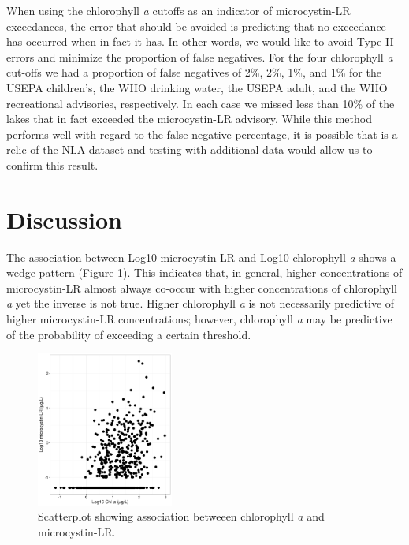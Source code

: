 \documentclass[10pt,a4paper,twocolumn]{article}
\begin{document}
When using the chlorophyll \emph{a} cutoffs as an indicator of
microcystin-LR exceedances, the error that should be avoided is
predicting that no exceedance has occurred when in fact it has. In other
words, we would like to avoid Type II errors and minimize the proportion
of false negatives. For the four chlorophyll \emph{a} cut-offs we had a
proportion of false negatives of 2\%, 2\%, 1\%, and 1\% for the USEPA
children's, the WHO drinking water, the USEPA adult, and the WHO
recreational advisories, respectively. In each case we missed less than
10\% of the lakes that in fact exceeded the microcystin-LR advisory.
While this method performs well with regard to the false negative
percentage, it is possible that is a relic of the NLA dataset and
testing with additional data would allow us to confirm this result.

\section{Discussion}\label{discussion}

The association between Log10 microcystin-LR and Log10 chlorophyll
\emph{a} shows a wedge pattern (Figure \ref{fig:chla_micro_scatter}).
This indicates that, in general, higher concentrations of microcystin-LR
almost always co-occur with higher concentrations of chlorophyll
\emph{a} yet the inverse is not true. Higher chlorophyll \emph{a} is not
necessarily predictive of higher microcystin-LR concentrations; however,
chlorophyll \emph{a} may be predictive of the probability of exceeding a
certain threshold.

\begin{figure}
\centering
\includegraphics[width=0.4\textwidth]{hollister_microcystin_fig2.jpg}
\caption{\label{fig:chla_micro_scatter}Scatterplot showing association betweeen chlorophyll \textit{a} and microcystin-LR. }
\end{figure}
\end{document}
